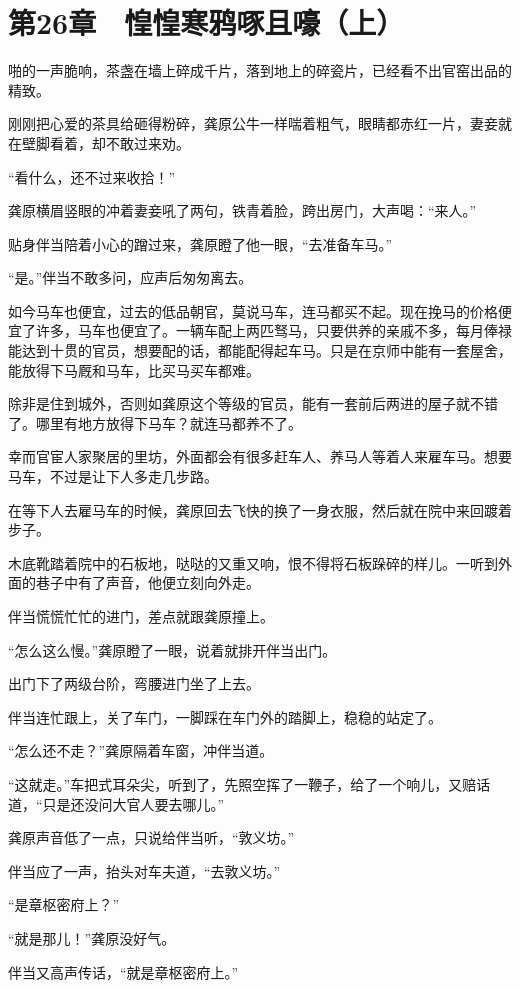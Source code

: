 \section{第26章　惶惶寒鸦啄且嚎（上）}

 啪的一声脆响，茶盏在墙上碎成千片，落到地上的碎瓷片，已经看不出官窑出品的精致。

刚刚把心爱的茶具给砸得粉碎，龚原公牛一样喘着粗气，眼睛都赤红一片，妻妾就在壁脚看着，却不敢过来劝。

“看什么，还不过来收拾！”

龚原横眉竖眼的冲着妻妾吼了两句，铁青着脸，跨出房门，大声喝：“来人。”

贴身伴当陪着小心的蹭过来，龚原瞪了他一眼，“去准备车马。”

“是。”伴当不敢多问，应声后匆匆离去。

如今马车也便宜，过去的低品朝官，莫说马车，连马都买不起。现在挽马的价格便宜了许多，马车也便宜了。一辆车配上两匹驽马，只要供养的亲戚不多，每月俸禄能达到十贯的官员，想要配的话，都能配得起车马。只是在京师中能有一套屋舍，能放得下马厩和马车，比买马买车都难。

除非是住到城外，否则如龚原这个等级的官员，能有一套前后两进的屋子就不错了。哪里有地方放得下马车？就连马都养不了。

幸而官宦人家聚居的里坊，外面都会有很多赶车人、养马人等着人来雇车马。想要马车，不过是让下人多走几步路。

在等下人去雇马车的时候，龚原回去飞快的换了一身衣服，然后就在院中来回踱着步子。

木底靴踏着院中的石板地，哒哒的又重又响，恨不得将石板跺碎的样儿。一听到外面的巷子中有了声音，他便立刻向外走。

伴当慌慌忙忙的进门，差点就跟龚原撞上。

“怎么这么慢。”龚原瞪了一眼，说着就排开伴当出门。

出门下了两级台阶，弯腰进门坐了上去。

伴当连忙跟上，关了车门，一脚踩在车门外的踏脚上，稳稳的站定了。

“怎么还不走？”龚原隔着车窗，冲伴当道。

“这就走。”车把式耳朵尖，听到了，先照空挥了一鞭子，给了一个响儿，又赔话道，“只是还没问大官人要去哪儿。”

龚原声音低了一点，只说给伴当听，“敦义坊。”

伴当应了一声，抬头对车夫道，“去敦义坊。”

“是章枢密府上？”

“就是那儿！”龚原没好气。

伴当又高声传话，“就是章枢密府上。”

